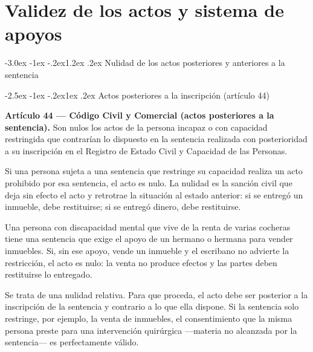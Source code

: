 \documentclass[12pt,oneside]{book}
\makeatletter
\renewcommand\section{\@startsection{section}{1}{\z@}%
  {-3.0ex \@plus -1ex \@minus -.2ex}{1.2ex \@plus .2ex}%
  {\normalfont\large\bfseries\color{acento}}}
\renewcommand\subsection{\@startsection{subsection}{2}{\z@}%
  {-2.5ex \@plus -1ex \@minus -.2ex}{1ex \@plus .2ex}%
  {\normalfont\normalsize\bfseries}}
\makeatother
\begin{document}

\chapter{Validez de los actos y sistema de apoyos}
\label{ch:bloque4}

\section{Nulidad de los actos posteriores y anteriores a la sentencia}

\subsection{Actos posteriores a la inscripción (artículo 44)}

\begin{importante}
\textbf{Artículo 44 --- Código Civil y Comercial (actos posteriores a la sentencia).} Son nulos los actos de la persona incapaz o con capacidad restringida que contrarían lo dispuesto en la sentencia realizada con posterioridad a su inscripción en el Registro de Estado Civil y Capacidad de las Personas.
\end{importante}

Si una persona sujeta a una sentencia que restringe su capacidad realiza un acto prohibido por esa sentencia, el acto es nulo. La nulidad es la sanción civil que deja sin efecto el acto y retrotrae la situación al estado anterior: si se entregó un inmueble, debe restituirse; si se entregó dinero, debe restituirse.

\begin{ejemplo}
Una persona con discapacidad mental que vive de la renta de varias cocheras tiene una sentencia que exige el apoyo de un hermano o hermana para vender inmuebles. Si, sin ese apoyo, vende un inmueble y el escribano no advierte la restricción, el acto es nulo: la venta no produce efectos y las partes deben restituirse lo entregado.
\end{ejemplo}

Se trata de una nulidad relativa. Para que proceda, el acto debe ser posterior a la inscripción de la sentencia y contrario a lo que ella dispone. Si la sentencia solo restringe, por ejemplo, la venta de inmuebles, el consentimiento que la misma persona preste para una intervención quirúrgica ---materia no alcanzada por la sentencia--- es perfectamente válido.
\end{document}
